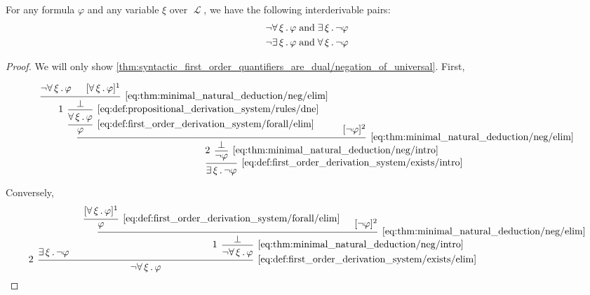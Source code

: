 \begin{proposition}\label{thm:syntactic_first_order_quantifiers_are_dual}
  For any formula \( \varphi \) and any variable \( \xi \) over \( \mscrL \), we have the following interderivable pairs:
  \begin{align}
    \neg \qforall \xi \varphi &\T{and} \qexists \xi \neg \varphi \label{thm:syntactic_first_order_quantifiers_are_dual/negation_of_universal} \\
    \neg \qexists \xi \varphi &\T{and} \qforall \xi \neg \varphi \label{thm:syntactic_first_order_quantifiers_are_dual/negation_of_existential}
  \end{align}
\end{proposition}
\begin{proof}
  We will only show \eqref{thm:syntactic_first_order_quantifiers_are_dual/negation_of_universal}. First,

  \begin{equation*}
    \begin{prooftree}
      \hypo{ \neg \qforall \xi \varphi }
      \hypo{ [\qforall \xi \varphi]^1 }
      \infer2[\eqref{eq:thm:minimal_natural_deduction/neg/elim}]{ \bot }
      \infer[left label=\( 1 \)]1[\eqref{eq:def:propositional_derivation_system/rules/dne}]{ \qforall \xi \varphi }
      \infer1[\eqref{eq:def:first_order_derivation_system/forall/elim}]{ \varphi }

      \hypo{ [\neg \varphi]^2 }
      \infer2[\eqref{eq:thm:minimal_natural_deduction/neg/elim}]{ \bot }

      \infer[left label=\( 2 \)]1[\eqref{eq:thm:minimal_natural_deduction/neg/intro}]{ \neg \varphi }
      \infer1[\eqref{eq:def:first_order_derivation_system/exists/intro}]{ \qexists \xi \neg \varphi }
    \end{prooftree}
  \end{equation*}

  Conversely,
  \begin{equation*}
    \begin{prooftree}
      \hypo{ \qexists \xi \neg \varphi }

      \hypo{ [\qforall \xi \varphi]^1 }
      \infer1[\eqref{eq:def:first_order_derivation_system/forall/elim}]{ \varphi }

      \hypo{ [\neg \varphi]^2 }
      \infer2[\eqref{eq:thm:minimal_natural_deduction/neg/elim}]{ \bot }
      \infer[left label=\( 1 \)]1[\eqref{eq:thm:minimal_natural_deduction/neg/intro}]{ \neg \qforall \xi \varphi }

      \infer[left label=\( 2 \)]2[\eqref{eq:def:first_order_derivation_system/exists/elim}]{ \neg \qforall \xi \varphi }
    \end{prooftree}
  \end{equation*}
\end{proof}

